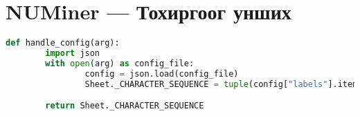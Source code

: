 \chapter{NUMiner --- Тохиргоог унших}
\label{appendix:handle_config}

\begin{lstlisting}[language=Python]
def handle_config(arg):
		import json
		with open(arg) as config_file:
				config = json.load(config_file)
				Sheet._CHARACTER_SEQUENCE = tuple(config["labels"].items())

		return Sheet._CHARACTER_SEQUENCE
\end{lstlisting}

\newpage
{}

